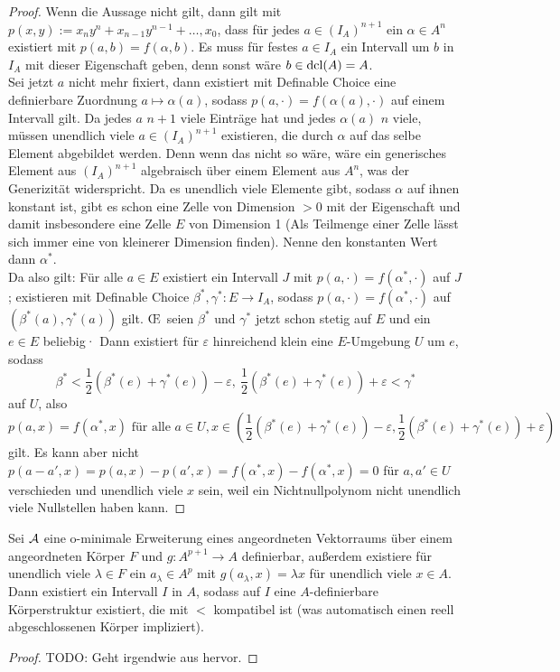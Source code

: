\begin{proof}
	Wenn die Aussage nicht gilt, dann gilt mit $p(x,y):=x_ny^n+x_{n-1}y^{n-1}+\dots,x_0$, dass für jedes $a\in (I_A)^{n+1}$ ein $\alpha\in A^n$ existiert mit $p(a,b)=f(\alpha,b)$. Es muss für festes $a\in I_A$ ein Intervall um $b$ in $I_A$ mit dieser Eigenschaft geben, denn sonst wäre $b\in\operatorname{dcl}(A)=A$.\\
	Sei jetzt $a$ nicht mehr fixiert, dann existiert mit Definable Choice eine definierbare Zuordnung $a\mapsto\alpha(a)$, sodass $p(a,\cdot)=f(\alpha(a),\cdot)$ auf einem Intervall gilt. Da jedes $a$ $n+1$ viele Einträge hat und jedes $\alpha(a)$ $n$ viele, müssen unendlich viele $a\in (I_A)^{n+1}$ existieren, die durch $\alpha$ auf das selbe Element abgebildet werden. Denn wenn das nicht so wäre, wäre ein generisches Element aus $(I_A)^{n+1}$ algebraisch über einem Element aus $A^n$, was der Generizität widerspricht. Da es unendlich viele Elemente gibt, sodass $\alpha$ auf ihnen konstant ist, gibt es schon eine Zelle von Dimension $>0$ mit der Eigenschaft und damit insbesondere eine Zelle $E$ von Dimension 1 (Als Teilmenge einer Zelle lässt sich immer eine von kleinerer Dimension finden). Nenne den konstanten Wert dann $\alpha^*$.\\
	Da also gilt: Für alle $a\in E$ existiert ein Intervall $J$ mit $p(a,\cdot)=f(\alpha^*,\cdot)$ auf $J$; existieren mit Definable Choice $\beta^*,\gamma^*:E\rightarrow I_A$, sodass $p(a,\cdot)=f(\alpha^*,\cdot)$ auf $(\beta^*(a),\gamma^*(a))$ gilt. \OE\ seien $\beta^*$ und $\gamma^*$ jetzt schon stetig auf $E$ und ein $e\in E$ beliebig· Dann existiert für $\varepsilon$ hinreichend klein eine $E$-Umgebung $U$ um $e$, sodass $$\beta^*<\frac{1}{2}(\beta^*(e)+\gamma^*(e))-\varepsilon,\ \frac{1}{2}(\beta^*(e)+\gamma^*(e))+\varepsilon<\gamma^*$$ auf $U$, also $$p(a,x)=f(\alpha^*,x)\text{ für alle }a\in U,x\in(\frac{1}{2}(\beta^*(e)+\gamma^*(e))-\varepsilon,\frac{1}{2}(\beta^*(e)+\gamma^*(e))+\varepsilon)$$ gilt. Es kann aber nicht $p(a-a',x)=p(a,x)-p(a',x)=f(\alpha^*,x)-f(\alpha^*,x)=0$ für $a,a'\in U$ verschieden und unendlich viele $x$ sein, weil ein Nichtnullpolynom nicht unendlich viele Nullstellen haben kann.
\end{proof}

\begin{lemma}
	Sei $\mathcal{A}$ eine o-minimale Erweiterung eines angeordneten Vektorraums über einem angeordneten Körper $F$ und $g:A^{p+1}\rightarrow A$ definierbar, außerdem existiere für unendlich viele $\lambda\in F$ ein $a_\lambda\in A^p$ mit $g(a_\lambda,x)=\lambda x$ für unendlich viele $x\in A$. Dann existiert ein Intervall $I$ in $A$, sodass auf $I$ eine $A$-definierbare Körperstruktur existiert, die mit $<$ kompatibel ist (was automatisch einen reell abgeschlossenen Körper impliziert).
\end{lemma}
\begin{proof}
	TODO: Geht irgendwie aus \cite{PeterStarch} hervor.
\end{proof}

